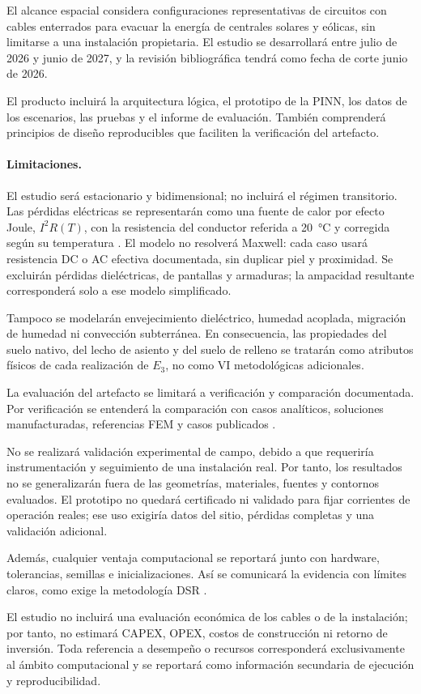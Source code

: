 El alcance espacial considera configuraciones representativas de circuitos con cables enterrados para evacuar la energía de centrales solares y eólicas, sin limitarse a una instalación propietaria. El estudio se desarrollará entre julio de 2026 y junio de 2027, y la revisión bibliográfica tendrá como fecha de corte junio de 2026.

El producto incluirá la arquitectura lógica, el prototipo de la PINN, los datos de los escenarios, las pruebas y el informe de evaluación. También comprenderá principios de diseño reproducibles que faciliten la verificación del artefacto.

\paragraph{Limitaciones.}

El estudio será estacionario y bidimensional; no incluirá el régimen transitorio. Las pérdidas eléctricas se representarán como una fuente de calor por efecto Joule, $I^2R(T)$, con la resistencia del conductor referida a \SI{20}{\celsius} y corregida según su temperatura \parencites[752--760]{neher1957}[cláusulas 4--5]{iec60287}. El modelo no resolverá Maxwell: cada caso usará resistencia DC o AC efectiva documentada, sin duplicar piel y proximidad. Se excluirán pérdidas dieléctricas, de pantallas y armaduras; la ampacidad resultante corresponderá solo a ese modelo simplificado.

Tampoco se modelarán envejecimiento dieléctrico, humedad acoplada, migración de humedad ni convección subterránea. En consecuencia, las propiedades del suelo nativo, del lecho de asiento y del suelo de relleno se tratarán como atributos físicos de cada realización de $E_3$, no como VI metodológicas adicionales.

La evaluación del artefacto se limitará a verificación y comparación documentada. Por verificación se entenderá la comparación con casos analíticos, soluciones manufacturadas, referencias FEM y casos publicados \parencites{cigre2022}[3--4,93--99]{cigre2025}.

No se realizará validación experimental de campo, debido a que requeriría instrumentación y seguimiento de una instalación real. Por tanto, los resultados no se generalizarán fuera de las geometrías, materiales, fuentes y contornos evaluados. El prototipo no quedará certificado ni validado para fijar corrientes de operación reales; ese uso exigiría datos del sitio, pérdidas completas y una validación adicional.

Además, cualquier ventaja computacional se reportará junto con hardware, tolerancias, semillas e inicializaciones. Así se comunicará la evidencia con límites claros, como exige la metodología DSR \parencite[350--351]{gregor2013}.

El estudio no incluirá una evaluación económica de los cables o de la instalación; por tanto, no estimará CAPEX, OPEX, costos de construcción ni retorno de inversión. Toda referencia a desempeño o recursos corresponderá exclusivamente al ámbito computacional y se reportará como información secundaria de ejecución y reproducibilidad.

